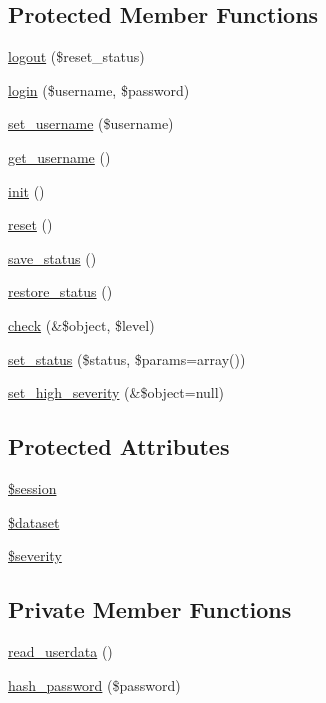 \subsection*{Protected Member Functions}
\begin{DoxyCompactItemize}
\item 
\hyperlink{classUserHandler_a0bcf46a5b0c4a5b495cba98b8da02b7b}{logout} (\$reset\_\-status)
\item 
\hyperlink{classUserHandler_abf6562660ee8ec1663afe08550a63643}{login} (\$username, \$password)
\item 
\hyperlink{classUserHandler_afbcc9a275b547cca0bd4cff567b054a0}{set\_\-username} (\$username)
\item 
\hyperlink{classUserHandler_a76e8c8b88c8d92f2d03645e810b9253c}{get\_\-username} ()
\item 
\hyperlink{class__OWL_ae0ef3ded56e8a6b34b6461e5a721cd3e}{init} ()
\item 
\hyperlink{class__OWL_a2f2a042bcf31965194c03033df0edc9b}{reset} ()
\item 
\hyperlink{class__OWL_a9e49b9c76fbc021b244c6915ea536d71}{save\_\-status} ()
\item 
\hyperlink{class__OWL_a465eeaf40edd9f9c848841700c32ce55}{restore\_\-status} ()
\item 
\hyperlink{class__OWL_ad6f4f6946f40199dd0333cf219fa500e}{check} (\&\$object, \$level)
\item 
\hyperlink{class__OWL_aea912d0ede9b3c2a69b79072d94d4787}{set\_\-status} (\$status, \$params=array())
\item 
\hyperlink{class__OWL_a576829692a3b66e3d518853bf43abae3}{set\_\-high\_\-severity} (\&\$object=null)
\end{DoxyCompactItemize}
\subsection*{Protected Attributes}
\begin{DoxyCompactItemize}
\item 
\hyperlink{classUserHandler_af097b7fd1ee085b46a6c34e071508a7f}{\$session}
\item 
\hyperlink{classUserHandler_ac38c1ea50b2820ed03781bdbe8eb2e08}{\$dataset}
\item 
\hyperlink{class__OWL_ad26b40a9dbbacb33e299b17826f8327c}{\$severity}
\end{DoxyCompactItemize}
\subsection*{Private Member Functions}
\begin{DoxyCompactItemize}
\item 
\hyperlink{classUserHandler_a4e9fb2f7763124ea84ebaf3b744d2d88}{read\_\-userdata} ()
\item 
\hyperlink{classUserHandler_a6b2bbbdb4f1a08578c219a933880a1de}{hash\_\-password} (\$password)
\end{DoxyCompactItemize}



